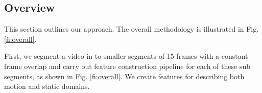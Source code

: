 
\subsection{Overview}

This section outlines our approach. The overall methodology is illustrated in Fig. \ref{fi:overall}.



\begin{figure*}
  \centering
  
  \caption{\textbf{Overall methodology}. The whole process consists of five major steps: (i) segmenting a video (ii) crafting static features, (iii) crafting motion features,
  (iv) fusing static and motion features, and (v) capturing temporal evolution of sub events. Static and motion features are independent
  and complementary. We generate static and motion features based on a pre-trained CNN and
  motion tubes respectively, and capture the temporal evolution of sub events using a LSTM network.}

 \label{fi:overall}
\end{figure*}


First, we segment a video in to smaller segments of 15 frames with a constant frame overlap
and carry out feature construction pipeline for each of these sub segments, as shown in Fig. \ref{fi:overall}.
We create features for describing both motion and static domains.

